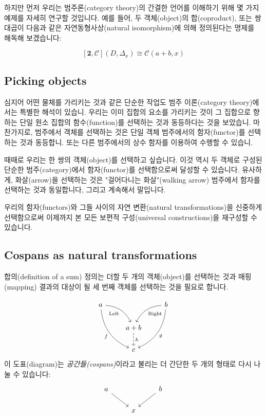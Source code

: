 \documentclass[DaoFP]{subfiles}
\begin{document}
하지만 먼저 우리는 범주론(category theory)의 간결한 언어를 이해하기 위해 몇 가지 예제를 자세히 연구할 것입니다. 예를 들어, 두 객체(object)의 합(coproduct), 또는 쌍대곱이 다음과 같은 자연동형사상(natural isomorphism)에 의해 정의된다는 명제를 해독해 보겠습니다:

\[ [\mathbf{2}, \mathcal{C}](D, \Delta_x)  \cong \mathcal{C}(a + b, x) \]



\subsection{Picking objects}

심지어 어떤 물체를 가리키는 것과 같은 단순한 작업도 범주 이론(category theory)에서는 특별한 해석이 있습니. 우리는 이미 집합의 요소를 가리키는 것이 그 집합으로 향하는 단일 원소 집합의 함수(function)를 선택하는 것과 동등하다는 것을 보았습니. 마찬가지로, 범주에서 객체를 선택하는 것은 단일 객체 범주에서의 함자(functor)를 선택하는 것과 동등합니. 또는 다른 범주에서의 상수 함자를 이용하여 수행할 수 있습니.

때때로 우리는 한 쌍의 객체(object)를 선택하고 싶습니다. 이것 역시 두 객체로 구성된 단순한 범주(category)에서 함자(functor)를 선택함으로써 달성할 수 있습니다. 유사하게, 화살(arrow)을 선택하는 것은 "걸어다니는 화살"(walking arrow) 범주에서 함자를 선택하는 것과 동일합니다, 그리고 계속해서 말입니다.

우리의 함자(functors)와 그들 사이의 자연 변환(natural transformations)을 신중하게 선택함으로써 이제까지 본 모든 보편적 구성(universal constructions)을 재구성할 수 있습니다.

\subsection{Cospans as natural transformations}

합의(definition of a sum) 정의는 더할 두 개의 객체(object)를 선택하는 것과 매핑(mapping) 결과의 대상이 될 세 번째 객체를 선택하는 것을 필요로 합니다.

\[
 \begin{tikzcd}
 a
 \arrow[dr,  bend left, "\text{Left}"']
 \arrow[ddr, bend right, "f"']
 && b
 \arrow[dl, bend right, "\text{Right}"]
 \arrow[ddl, bend left, "g"]
 \\
&a + b
\arrow[d, dashed, "h"]
\\
& c
 \end{tikzcd}
\]
이 도표(diagram)는 \emph{공간들(cospans)}이라고 불리는 더 간단한 두 개의 형태로 다시 나눌 수 있습니다:
\[
 \begin{tikzcd}
 a
 \arrow[dr, ""']
 && b
 \arrow[dl, ""]
 \\
 & x
 \end{tikzcd}
\]
\end{document}
